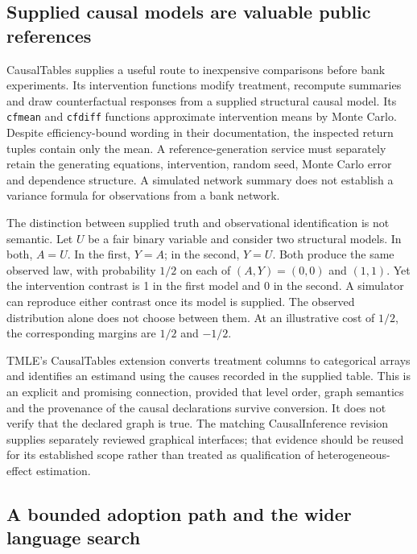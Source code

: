 \subsection{Supplied causal models are valuable public references}
\label{exec21:effects-scm}

CausalTables supplies a useful route to inexpensive comparisons before bank
experiments. Its intervention functions modify treatment, recompute
summaries and draw counterfactual responses from a supplied structural
causal model. Its \texttt{cfmean} and \texttt{cfdiff} functions approximate
intervention means by Monte Carlo. Despite efficiency-bound wording in
their documentation, the inspected return tuples contain only the mean.
A reference-generation service must separately retain the generating
equations, intervention, random seed, Monte Carlo error and dependence
structure. A simulated network summary does not establish a variance formula
for observations from a bank network. \cite{exec21_effects_causaltables}

The distinction between supplied truth and observational identification is
not semantic. Let $U$ be a fair binary variable and consider two structural
models. In both, $A=U$. In the first, $Y=A$; in the second, $Y=U$. Both
produce the same observed law, with probability $1/2$ on each of
$(A,Y)=(0,0)$ and $(1,1)$. Yet the intervention contrast is 1 in the first
model and 0 in the second. A simulator can reproduce either contrast once
its model is supplied. The observed distribution alone does not choose
between them. At an illustrative cost of $1/2$, the corresponding margins
are $1/2$ and $-1/2$. \cite{exec21_effects_reference}

TMLE's CausalTables extension converts treatment columns to categorical
arrays and identifies an estimand using the causes recorded in the supplied
table. This is an explicit and promising connection, provided that level
order, graph semantics and the provenance of the causal declarations survive
conversion. It does not verify that the declared graph is true. The
matching CausalInference revision supplies separately reviewed graphical
interfaces; that evidence should be reused for its established scope rather
than treated as qualification of heterogeneous-effect estimation.
\cite{exec21_effects_tmle,exec19_otherid_julia}

\subsection{A bounded adoption path and the wider language search}
\label{exec21:effects-integration}

